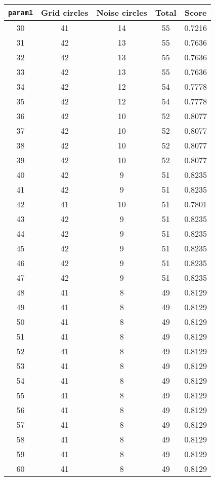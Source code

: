 \documentclass[letterpaper, 12pt]{article}
\begin{document}
\begin{longtable}{|c|c|c|c|c|}
\hline
\textbf{\texttt{param1}} & \textbf{Grid circles} & \textbf{Noise circles} & \textbf{Total} & \textbf{Score} \\
\hline
30 & 41 & 14 & 55 & 0.7216 \\
\hline
31 & 42 & 13 & 55 & 0.7636 \\
\hline
32 & 42 & 13 & 55 & 0.7636 \\
\hline
33 & 42 & 13 & 55 & 0.7636 \\
\hline
34 & 42 & 12 & 54 & 0.7778 \\
\hline
35 & 42 & 12 & 54 & 0.7778 \\
\hline
36 & 42 & 10 & 52 & 0.8077 \\
\hline
37 & 42 & 10 & 52 & 0.8077 \\
\hline
38 & 42 & 10 & 52 & 0.8077 \\
\hline
39 & 42 & 10 & 52 & 0.8077 \\
\hline
40 & 42 & 9 & 51 & 0.8235 \\
\hline
41 & 42 & 9 & 51 & 0.8235 \\
\hline
42 & 41 & 10 & 51 & 0.7801 \\
\hline
43 & 42 & 9 & 51 & 0.8235 \\
\hline
44 & 42 & 9 & 51 & 0.8235 \\
\hline
45 & 42 & 9 & 51 & 0.8235 \\
\hline
46 & 42 & 9 & 51 & 0.8235 \\
\hline
47 & 42 & 9 & 51 & 0.8235 \\
\hline
48 & 41 & 8 & 49 & 0.8129 \\
\hline
49 & 41 & 8 & 49 & 0.8129 \\
\hline
50 & 41 & 8 & 49 & 0.8129 \\
\hline
51 & 41 & 8 & 49 & 0.8129 \\
\hline
52 & 41 & 8 & 49 & 0.8129 \\
\hline
53 & 41 & 8 & 49 & 0.8129 \\
\hline
54 & 41 & 8 & 49 & 0.8129 \\
\hline
55 & 41 & 8 & 49 & 0.8129 \\
\hline
56 & 41 & 8 & 49 & 0.8129 \\
\hline
57 & 41 & 8 & 49 & 0.8129 \\
\hline
58 & 41 & 8 & 49 & 0.8129 \\
\hline
59 & 41 & 8 & 49 & 0.8129 \\
\hline
60 & 41 & 8 & 49 & 0.8129 \\
\hline

\end{longtable}
\end{document}
